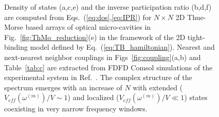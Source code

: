 \begin{figure}%
\vskip -0.15in
\vskip -0.15in
\caption[Density of states (a,c,e) and the inverse participation ratio (b,d,f) are computed from Eqs.~(\ref{eq:dos},\ref{eq:IPR}) for $N\times N$ 2D Thue-Morse based arrays of optical micro-cavities in Fig.~\ref{fig:ThMo_reduction}(e) in the framework of the 2D tight-binding model defined by Eq.~(\ref{eq:TB_hamiltonian}).]{\label{fig:tm_dos} Density of states (a,c,e) and the inverse participation ratio (b,d,f) are computed from Eqs.~(\ref{eq:dos},\ref{eq:IPR}) for $N\times N$ 2D Thue-Morse based arrays of optical micro-cavities in Fig.~\ref{fig:ThMo_reduction}(e) in the framework of the 2D tight-binding model defined by Eq.~(\ref{eq:TB_hamiltonian}). Nearest and next-nearest neighbor couplings in Figs~\ref{fig:coupling}(a,b) and Table~\ref{tab:c} are extracted from FDFD Comsol simulations of the experimental system in Ref.~. The complex structure of the spectrum emerges with an increase of $N$ with extended ($V_{eff}(\omega^{(m)})/V\sim 1$) and localized ($V_{eff}(\omega^{(m)})/V\ll 1$) states coexisting in very narrow frequency windows. }
\end{figure}

